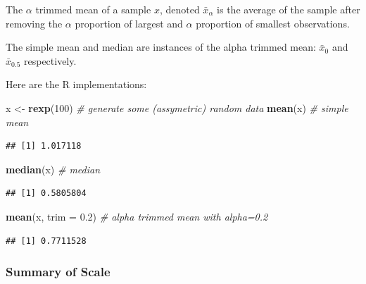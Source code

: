 \documentclass[]{book}
\newenvironment{Shaded}{\begin{snugshade}}{\end{snugshade}}
\newcommand{\KeywordTok}[1]{\textcolor[rgb]{0.13,0.29,0.53}{\textbf{#1}}}
\newcommand{\DataTypeTok}[1]{\textcolor[rgb]{0.13,0.29,0.53}{#1}}
\newcommand{\DecValTok}[1]{\textcolor[rgb]{0.00,0.00,0.81}{#1}}
\newcommand{\FloatTok}[1]{\textcolor[rgb]{0.00,0.00,0.81}{#1}}
\newcommand{\StringTok}[1]{\textcolor[rgb]{0.31,0.60,0.02}{#1}}
\newcommand{\CommentTok}[1]{\textcolor[rgb]{0.56,0.35,0.01}{\textit{#1}}}
\newcommand{\NormalTok}[1]{#1}
\theoremstyle{definition}
\theoremstyle{definition}
\theoremstyle{definition}
\theoremstyle{remark}
\let\BeginKnitrBlock\begin \let\EndKnitrBlock\end
\begin{document}
\BeginKnitrBlock{definition}[Alpha Trimmed Mean]
\protect\hypertarget{def:unnamed-chunk-116}{}{\label{def:unnamed-chunk-116}
{} }The \(\alpha\) trimmed mean of a
sample \(x\), denoted \(\bar x_\alpha\) is the average of the sample
after removing the \(\alpha\) proportion of largest and \(\alpha\)
proportion of smallest observations.
\EndKnitrBlock{definition}

The simple mean and median are instances of the alpha trimmed mean:
\(\bar x_0\) and \(\bar x_{0.5}\) respectively.

Here are the R implementations:

\begin{Shaded}
\begin{Highlighting}[]
\NormalTok{x <-}\StringTok{ }\KeywordTok{rexp}\NormalTok{(}\DecValTok{100}\NormalTok{) }\CommentTok{# generate some (assymetric) random data}
\KeywordTok{mean}\NormalTok{(x) }\CommentTok{# simple mean}
\end{Highlighting}
\end{Shaded}

\begin{verbatim}
## [1] 1.017118
\end{verbatim}

\begin{Shaded}
\begin{Highlighting}[]
\KeywordTok{median}\NormalTok{(x) }\CommentTok{# median}
\end{Highlighting}
\end{Shaded}

\begin{verbatim}
## [1] 0.5805804
\end{verbatim}

\begin{Shaded}
\begin{Highlighting}[]
\KeywordTok{mean}\NormalTok{(x, }\DataTypeTok{trim =} \FloatTok{0.2}\NormalTok{) }\CommentTok{# alpha trimmed mean with alpha=0.2}
\end{Highlighting}
\end{Shaded}

\begin{verbatim}
## [1] 0.7711528
\end{verbatim}

\subsubsection{Summary of Scale}\label{summary-of-scale}
\end{document}
